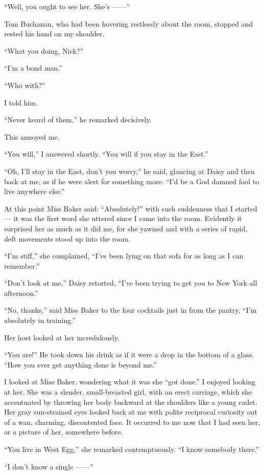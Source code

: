 \documentclass{znotebook}
\begin{document}
``Well, you ought to see her. She's ——''

Tom Buchanan, who had been hovering restlessly about the room, stopped and rested his hand on my shoulder.

``What you doing, Nick?''

``I'm a bond man.''

``Who with?''

I told him.

``Never heard of them,'' he remarked decisively.

This annoyed me.

``You will,'' I answered shortly. ``You will if you stay in the East.''

``Oh, I'll stay in the East, don't you worry,'' he said, glancing at Daisy and then back at me, as if he were alert for something more. ``I'd be a God damned fool to live anywhere else.''

At this point Miss Baker said: ``Absolutely!'' with such suddenness that I started — it was the first word she uttered since I came into the room. Evidently it surprised her as much as it did me, for she yawned and with a series of rapid, deft movements stood up into the room.

``I'm stiff,'' she complained, ``I've been lying on that sofa for as long as I can remember.''

``Don't look at me,'' Daisy retorted, ``I've been trying to get you to New York all afternoon.''

``No, thanks,'' said Miss Baker to the four cocktails just in from the pantry, ``I'm absolutely in training.''

Her host looked at her incredulously.

``You are!'' He took down his drink as if it were a drop in the bottom of a glass. ``How you ever get anything done is beyond me.''

I looked at Miss Baker, wondering what it was she ``got done.'' I enjoyed looking at her. She was a slender, small-breasted girl, with an erect carriage, which she accentuated by throwing her body backward at the shoulders like a young cadet. Her gray sun-strained eyes looked back at me with polite reciprocal curiosity out of a wan, charming, discontented face. It occurred to me now that I had seen her, or a picture of her, somewhere before.

``You live in West Egg,'' she remarked contemptuously. ``I know somebody there.''

``I don't know a single ——''
\end{document}
